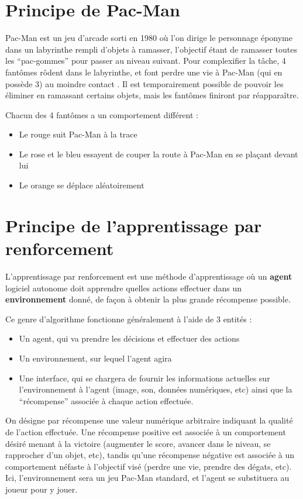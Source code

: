 \section{Principe de Pac-Man}
Pac-Man est un jeu d’arcade sorti en 1980 où l’on dirige le personnage éponyme dans un labyrinthe rempli d’objets à ramasser, l’objectif étant de ramasser toutes les “pac-gommes” pour passer au niveau suivant.
Pour complexifier la tâche, 4 fantômes rôdent dans le labyrinthe, et font perdre une vie à Pac-Man (qui en possède 3) au moindre contact . Il est temporairement possible de pouvoir les éliminer en ramassant certains objets, mais les fantômes finiront par réapparaître.
\par
Chacun des 4 fantômes a un comportement différent :

\begin{itemize}
	\item Le rouge suit Pac-Man à la trace
	\item Le rose et le bleu essayent de couper la route à Pac-Man en se plaçant devant lui
	\item Le orange se déplace aléatoirement
\end{itemize}


\section{Principe de l’apprentissage par renforcement}

L’apprentissage par renforcement est une méthode d’apprentissage où un \textbf{agent} logiciel autonome doit apprendre quelles actions effectuer dans un \textbf{environnement} donné, de façon à obtenir la plus grande récompense possible.\par

Ce genre d’algorithme fonctionne généralement à l’aide de 3 entités : 
\begin{itemize}
	\item Un agent, qui va prendre les décisions et effectuer des actions
	\item Un environnement, sur lequel l’agent agira
	\item Une interface, qui se chargera de fournir les informations actuelles sur l’environnement à l’agent (image, son, données numériques, etc) ainsi que la ``récompense'' associée à chaque action effectuée.
\end{itemize}

On désigne par récompense une valeur numérique arbitraire indiquant la qualité de l'action effectuée. Une récompense positive est associée à un comportement désiré menant à la victoire (augmenter le score, avancer dans le niveau, se rapprocher d'un objet, etc), tandis qu'une récompense négative est associée à un comportement néfaste à l'objectif visé (perdre une vie, prendre des dégats, etc).
Ici, l’environnement sera un jeu Pac-Man standard, et l’agent se substituera au joueur pour y jouer.


